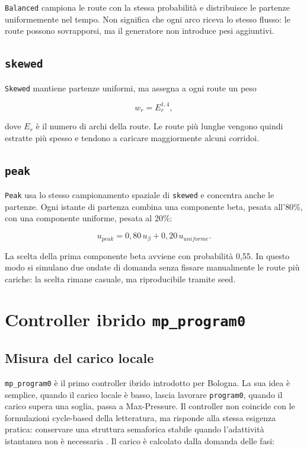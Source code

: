 \documentclass[12pt,a4paper,oneside]{report}
\numberwithin{equation}{chapter}
\begin{document}
\texttt{Balanced} campiona le route con la stessa probabilità e distribuisce le
partenze uniformemente nel tempo. Non significa che ogni arco riceva lo stesso
flusso: le route possono sovrapporsi, ma il generatore non introduce pesi
aggiuntivi.

\subsection{\texttt{skewed}}

\texttt{Skewed} mantiene partenze uniformi, ma assegna a ogni route un peso

\begin{equation}
    w_r=E_r^{1{,}4},
    \label{eq:route-weight}
\end{equation}

dove $E_r$ è il numero di archi della route. Le route più lunghe vengono quindi
estratte più spesso e tendono a caricare maggiormente alcuni corridoi.

\subsection{\texttt{peak}}

\texttt{Peak} usa lo stesso campionamento spaziale di \texttt{skewed} e
concentra anche le partenze. Ogni istante di partenza combina una componente
beta, pesata all'80\%, con una componente uniforme, pesata al 20\%:

\begin{equation}
    u_{peak}=0{,}80\,u_{\beta}+0{,}20\,u_{uniforme}.
    \label{eq:peak-mixture}
\end{equation}

La scelta della prima componente beta avviene con probabilità 0,55. In questo
modo si simulano due ondate di domanda senza fissare manualmente le route più
cariche: la scelta rimane casuale, ma riproducibile tramite seed.

\section{Controller ibrido \texttt{mp\_program0}}
\label{sec:mp-program0}

\subsection{Misura del carico locale}

\texttt{mp\_program0} è il primo controller ibrido introdotto per Bologna. La
sua idea è semplice, quando il carico locale è basso, lascia lavorare
\texttt{program0}, quando il carico supera una soglia, passa a Max-Pressure. Il
controller non coincide con le formulazioni cycle-based della letteratura, ma
risponde alla stessa esigenza pratica: conservare una struttura semaforica
stabile quando l'adattività istantanea non è necessaria
\cite{anderson2018cyclebased,levin2020cyclical}. Il carico è calcolato dalla
domanda delle fasi:
\end{document}
